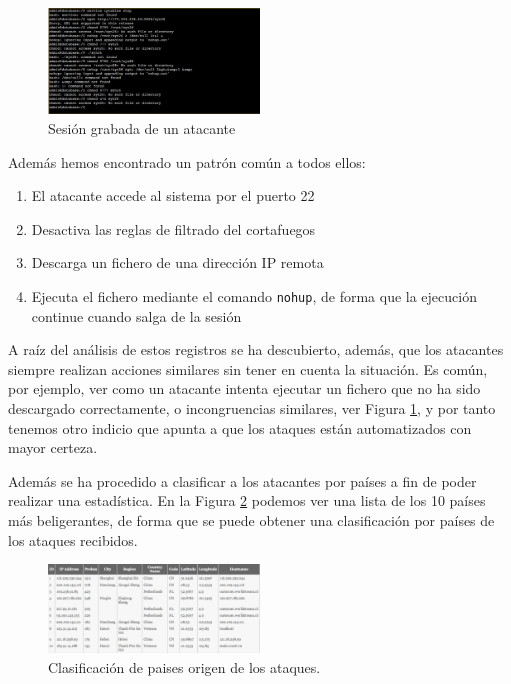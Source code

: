 \documentclass[journal]{IEEEtran}
\begin{document}
\begin{figure}
\centering
\includegraphics[width=0.5\textwidth]{img/session}
\caption{Sesión grabada de un atacante}
\label{fig:session}
\end{figure}

Además hemos encontrado un patrón común a todos ellos:
\begin{enumerate}
\item El atacante accede al sistema por el puerto 22
\item Desactiva las reglas de filtrado del cortafuegos
\item Descarga un fichero de una dirección IP remota
\item Ejecuta el fichero mediante el comando {\tt nohup}, de forma que la ejecución continue cuando salga de la sesión
\end{enumerate}

A raíz del análisis de estos registros se ha descubierto, además, que los atacantes siempre realizan acciones similares sin tener en cuenta la situación. Es común, por ejemplo, ver como un atacante intenta ejecutar un fichero que no ha sido descargado correctamente, o incongruencias similares, ver Figura \ref{fig:session}, y por tanto tenemos otro indicio que apunta a que los ataques están automatizados con mayor certeza.

Además se ha procedido a clasificar a los atacantes por países a fin de poder realizar una estadística. En la Figura \ref{fig:country_profiling} podemos ver una lista de los 10 países más beligerantes, de forma que se puede obtener una clasificación por países de los ataques recibidos.

\begin{figure}
\centering
\includegraphics[width=0.5\textwidth]{img/country_profiling}
\caption{Clasificación de paises origen de los ataques.}
\label{fig:country_profiling}
\end{figure}
\end{document}

